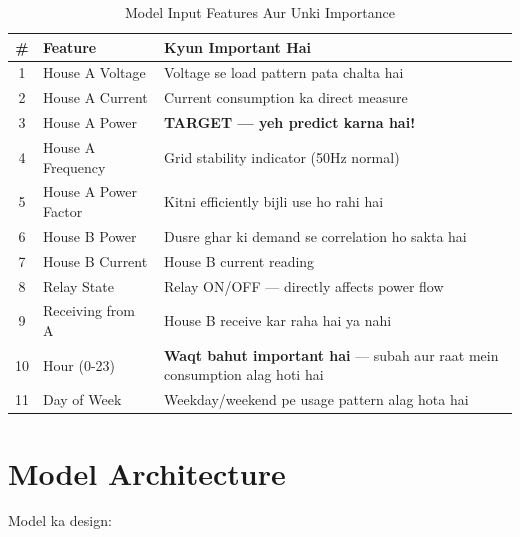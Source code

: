 \begin{table}[H]
\centering
\begin{tabularx}{\textwidth}{c l X}
\toprule
\textbf{\#} & \textbf{Feature} & \textbf{Kyun Important Hai} \\
\midrule
1 & House A Voltage & Voltage se load pattern pata chalta hai \\
2 & House A Current & Current consumption ka direct measure \\
3 & House A Power & \textbf{TARGET --- yeh predict karna hai!} \\
4 & House A Frequency & Grid stability indicator (50Hz normal) \\
5 & House A Power Factor & Kitni efficiently bijli use ho rahi hai \\
6 & House B Power & Dusre ghar ki demand se correlation ho sakta hai \\
7 & House B Current & House B current reading \\
8 & Relay State & Relay ON/OFF --- directly affects power flow \\
9 & Receiving from A & House B receive kar raha hai ya nahi \\
10 & Hour (0-23) & \textbf{Waqt bahut important hai} --- subah aur raat mein consumption alag hoti hai \\
11 & Day of Week & Weekday/weekend pe usage pattern alag hota hai \\
\bottomrule
\end{tabularx}
\caption{Model Input Features Aur Unki Importance}
\end{table}

\section{Model Architecture}

Model ka design:

